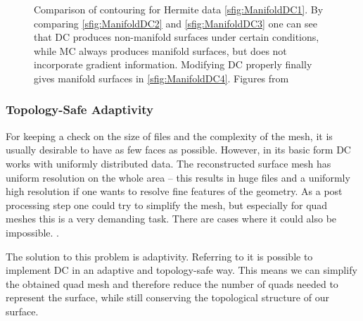 \begin{figure}
\begin{center}
\begin{subfigure}[t]{.2\textwidth}
\begin{center}
\label{sfig:ManifoldDC4}
\end{center}
\end{subfigure}
\caption{Comparison of contouring for Hermite data \autoref{sfig:ManifoldDC1}. By comparing \autoref{sfig:ManifoldDC2} and \autoref{sfig:ManifoldDC3} one can see that \ac{DC} produces non-manifold surfaces under certain conditions, while \ac{MC} always produces manifold surfaces, but does not incorporate gradient information. Modifying \ac{DC} properly finally gives manifold surfaces in \autoref{sfig:ManifoldDC4}. Figures from \cite{Schaefer2007}}
\label{fig:manifold}
\end{center}
\end{figure}

\subsubsection{Topology-Safe Adaptivity}
For keeping a check on the size of files and the complexity of the mesh, it is usually desirable to have as few faces as possible. However, in its basic form \ac{DC} works with uniformly distributed data. The reconstructed surface mesh has uniform resolution on the whole area -- this results in huge files and a uniformly high resolution if one wants to resolve fine features of the geometry. As a post processing step one could try to simplify the mesh, but especially for \ac{quad} meshes this is a very demanding task. There are cases where it could also be impossible. \cite{Puppo2010}.

The solution to this problem is adaptivity. Referring to \cite{Hermite2002} it is possible to implement \ac{DC} in an adaptive and topology-safe way. This means we can simplify the obtained \ac{quad} mesh and therefore reduce the number of \acp{quad} needed to represent the surface, while still conserving the topological structure of our surface.

